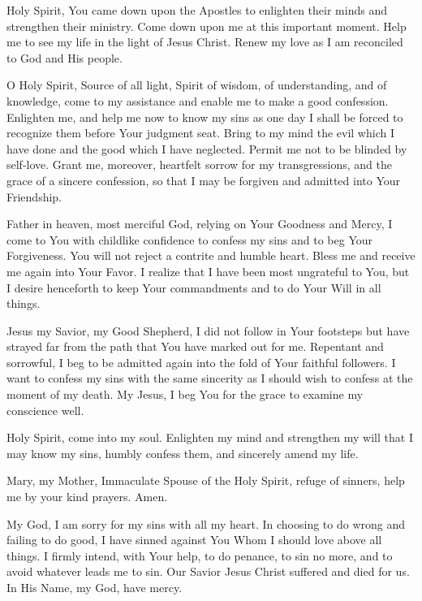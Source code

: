 Holy Spirit,
You came down upon the Apostles to enlighten their minds and strengthen their ministry.
Come down upon me at this important moment.
Help me to see my life in the light of Jesus Christ.
Renew my love as I am reconciled to God and His people.

O Holy Spirit, Source of all light, Spirit of wisdom, of understanding, and of knowledge, come to my assistance and enable me to make a good confession.
Enlighten me, and help me now to know my sins as one day I shall be forced to recognize them before Your judgment seat.
Bring to my mind the evil which I have done and the good which I have neglected.
Permit me not to be blinded by self-love.
Grant me, moreover, heartfelt sorrow for my transgressions, and the grace of a sincere confession, so that I may be forgiven and admitted into Your Friendship.

Father in heaven, most merciful God, relying on Your Goodness and Mercy, I come to You with childlike confidence to confess my sins and to beg Your Forgiveness.
You will not reject a contrite and humble heart.
Bless me and receive me again into Your Favor.
I realize that I have been most ungrateful to You, but I desire henceforth to keep Your commandments and to do Your Will in all things.

Jesus my Savior, my Good Shepherd, I did not follow in Your footsteps but have strayed far from the path that You have marked out for me.
Repentant and sorrowful, I beg to be admitted again into the fold of Your faithful followers.
I want to confess my sins with the same sincerity as I should wish to confess at the moment of my death.
My Jesus, I beg You for the grace to examine my conscience well.

Holy Spirit, come into my soul.
Enlighten my mind and strengthen my will that I may know my sins, humbly confess them, and sincerely amend my life.

Mary, my Mother, Immaculate Spouse of the Holy Spirit, refuge of sinners, help me by your kind prayers. Amen.

My God,
I am sorry for my sins with all my heart.
In choosing to do wrong and failing to do good, I have sinned against You Whom I should love above all things.
I firmly intend, with Your help, to do penance, to sin no more, and to avoid whatever leads me to sin.
Our Savior Jesus Christ suffered and died for us.
In His Name, my God, have mercy.

